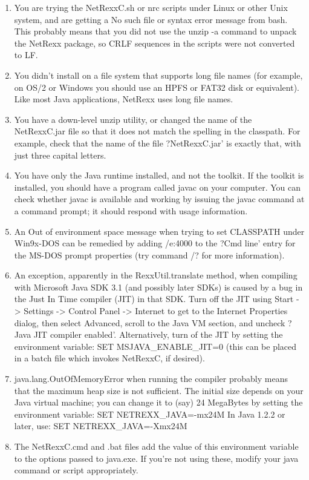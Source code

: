 \begin{enumerate}
\item You are trying the NetRexxC.sh or nrc scripts under Linux or other Unix system, and are getting a No such file or syntax error message from bash. This probably means that you did not use the unzip -a command to unpack the NetRexx package, so CRLF sequences in the scripts were not converted to LF.
\item You didn't install on a file system that supports long file names (for example, on OS/2 or Windows you should use an HPFS or FAT32 disk or equivalent). Like most Java applications, NetRexx uses long file names.
\item You have a down-level unzip utility, or changed the name of the NetRexxC.jar file so that it does not match the spelling in the classpath. For example, check that the name of the file ?NetRexxC.jar’ is exactly that, with just three capital letters.
\item You have only the Java runtime installed, and not the toolkit. If the toolkit is installed, you should have a program called javac on your computer. You can check whether javac is available and working by issuing the javac command at a command prompt; it should respond with usage information.
\item An Out of environment space message when trying to set CLASSPATH under Win9x-DOS can be remedied by adding /e:4000 to the ?Cmd line’ entry for the MS-DOS prompt properties (try command /? for more information).
\item An exception, apparently in the RexxUtil.translate method, when compiling with Microsoft Java SDK 3.1 (and possibly later SDKs) is caused by a bug in the Just In Time compiler (JIT) in that SDK. Turn off the JIT using Start -> Settings -> Control Panel -> Internet to get to the Internet Properties dialog, then select Advanced, scroll to the Java VM section, and uncheck ?Java JIT compiler enabled’. Alternatively, turn of the JIT by setting the environment variable:
  SET MSJAVA\_ENABLE\_JIT=0
(this can be placed in a batch file which invokes NetRexxC, if desired).
\item java.lang.OutOfMemoryError when running the compiler probably means that the maximum heap size is not sufficient. The initial size depends on your Java virtual machine; you can change it to (say) 24 MegaBytes by setting the environment variable:
  SET NETREXX\_JAVA=-mx24M
In Java 1.2.2 or later, use:
  SET NETREXX\_JAVA=-Xmx24M
\item The NetRexxC.cmd and .bat files add the value of this environment variable to the options passed to java.exe. If you're not using these, modify your java command or script appropriately.

\end{enumerate}
